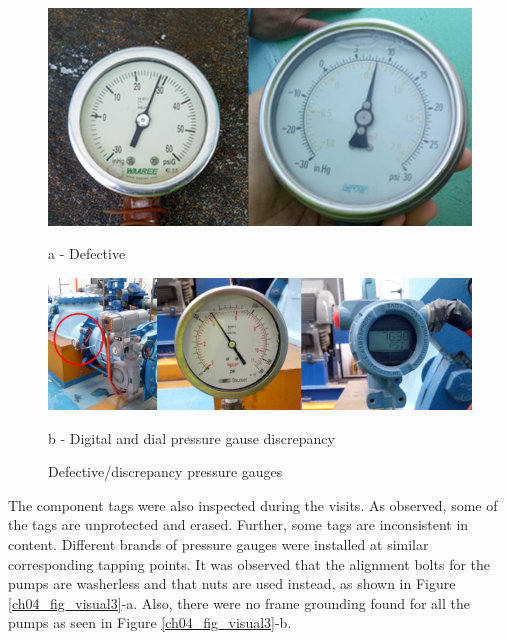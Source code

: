 \begin{figure}[!htb]
	\begin{minipage}[b]{0.5\linewidth}
		\centering
		\includegraphics[width=\textwidth]{figures/ch04_fig_visual04}
		\caption*{a - Defective}
	\end{minipage}
	\hspace{0.05cm}
	\begin{minipage}[b]{0.5\linewidth}
		\centering
		\includegraphics[width=\textwidth]{figures/ch04_fig_visual05}
		\caption*{b - Digital and dial pressure gause discrepancy}
	\end{minipage}
	\caption{Defective/discrepancy pressure gauges}
	\label{ch04_fig_visual2}
\end{figure}

The component tags were also inspected during the visits. As observed, some of the tags are unprotected and erased. Further, some tags are inconsistent in content. Different brands of pressure gauges were installed at similar corresponding tapping points. It was observed that the alignment bolts for the pumps are washerless and that nuts are used instead, as shown in Figure \ref{ch04_fig_visual3}-a. Also, there were no frame grounding found for all the pumps as seen in Figure \ref{ch04_fig_visual3}-b.

